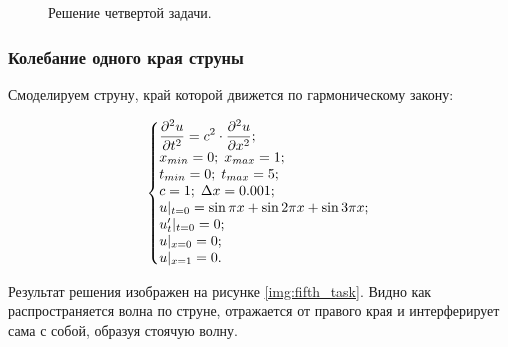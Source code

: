 \documentclass[12pt,a4paper,russian]{report}
\begin{document}
	\begin{figure}[h]
		\caption{Решение четвертой задачи.}
		\label{img:fourth_task}
	\end{figure}
	
	\newpage
	\subsubsection{Колебание одного края струны}
	
	Смоделируем струну, край которой движется по гармоническому закону:
	
	\begin{equation*}
		\left\{\begin{array}{@{}l@{}}
			\displaystyle \frac{\partial^2u}{\partial t^2} = c^2 \cdot \frac{\partial^2u}{\partial x^2}; \\
			x_{min} = 0; \; x_{max} = 1; \\
			t_{min} = 0; \; t_{max} = 5; \\
			c = 1; \;  \Delta x = 0.001; \\
			u|_{t=0} = \sin \pi x + \sin 2 \pi x + \sin 3 \pi x; \\
			u'_{t}|_{t=0} = 0; \\
			u|_{x=0} = 0; \\
			u|_{x=1} = 0.
		\end{array}\right.\,
	\end{equation*}
	
	Результат решения изображен на рисунке \ref{img:fifth_task}. Видно как распространяется волна по струне, отражается от правого края и интерферирует сама с собой, образуя стоячую волну.
	
\end{document}
